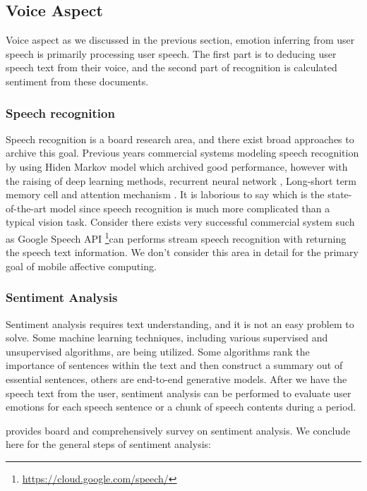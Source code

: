 \subsection{Voice Aspect}\label{subsec:voice-model}

Voice aspect as we discussed in the previous section, emotion inferring from user speech is primarily processing user speech. The first part is to deducing user speech text from their voice, and the second part of recognition is calculated sentiment from these documents.

\subsubsection{Speech recognition}

Speech recognition is a board research area, and there exist broad approaches to archive this goal. Previous years commercial systems modeling speech recognition by using Hiden Markov model which archived good performance, however with the raising of deep learning methods, recurrent neural network \cite{mikolov2010recurrent}, Long-short term memory cell \cite{hochreiter1997long} and attention mechanism \cite{google2017}. It is laborious to say which is the state-of-the-art model since speech recognition is much more complicated than a typical vision task. Consider there exists very successful commercial system such as Google Speech API \footnote{\url{https://cloud.google.com/speech/}}can performs stream speech recognition with returning the speech text information. We don't consider this area in detail for the primary goal of mobile affective computing.

\subsubsection{Sentiment Analysis}

Sentiment analysis requires text understanding, and it is not an easy problem to solve. Some machine learning techniques, including various supervised and unsupervised algorithms, are being utilized. Some algorithms rank the importance of sentences within the text and then construct a summary out of essential sentences, others are end-to-end generative models. After we have the speech text from the user, sentiment analysis can be performed to evaluate user emotions for each speech sentence or a chunk of speech contents during a period.

\cite{Rajalakshmi2017ACS} provides board and comprehensively survey on sentiment analysis. We conclude here for the general steps of sentiment analysis:

